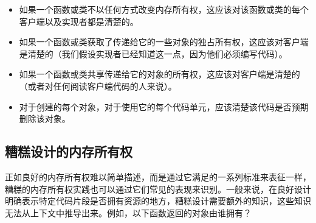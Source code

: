 \begin{itemize}
\item
  如果一个函数或类不以任何方式改变内存所有权，这应该对该函数或类的每个客户端以及实现者都是清楚的。
\item
  如果一个函数或类获取了传递给它的一些对象的独占所有权，这应该对客户端是清楚的（我们假设实现者已经知道这一点，因为他们必须编写代码）。
\item
  如果一个函数或类共享传递给它的对象的所有权，这应该对客户端是清楚的（或者对任何阅读客户端代码的人来说）。
\item
  对于创建的每个对象，对于使用它的每个代码单元，应该清楚该代码是否预期删除该对象。
\end{itemize}

\subsection{糟糕设计的内存所有权}

正如良好的内存所有权难以简单描述，而是通过它满足的一系列标准来表征一样，糟糕的内存所有权实践也可以通过它们常见的表现来识别。一般来说，在良好设计明确表示特定代码片段是否拥有资源的地方，糟糕设计需要额外的知识，这些知识无法从上下文中推导出来。例如，以下函数返回的对象由谁拥有？


